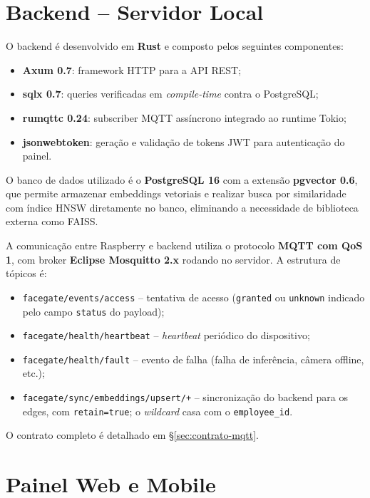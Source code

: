 \documentclass[12pt,a4paper]{report}
\begin{document}
\section{Backend -- Servidor Local}

O backend é desenvolvido em \textbf{Rust} e composto pelos seguintes componentes:

\begin{itemize}
    \item \textbf{Axum 0.7}: framework HTTP para a API REST;
    \item \textbf{sqlx 0.7}: queries verificadas em \textit{compile-time} contra o PostgreSQL;
    \item \textbf{rumqttc 0.24}: subscriber MQTT assíncrono integrado ao runtime Tokio;
    \item \textbf{jsonwebtoken}: geração e validação de tokens JWT para autenticação do painel.
\end{itemize}

O banco de dados utilizado é o \textbf{PostgreSQL 16} com a extensão \textbf{pgvector 0.6}, que permite armazenar embeddings vetoriais e realizar busca por similaridade com índice HNSW diretamente no banco, eliminando a necessidade de biblioteca externa como FAISS.

A comunicação entre Raspberry e backend utiliza o protocolo \textbf{MQTT com QoS\,1}, com broker \textbf{Eclipse Mosquitto 2.x} rodando no servidor. A estrutura de tópicos é:

\begin{itemize}
    \item \texttt{facegate/events/access} -- tentativa de acesso (\texttt{granted} ou \texttt{unknown} indicado pelo campo \texttt{status} do payload);
    \item \texttt{facegate/health/heartbeat} -- \textit{heartbeat} periódico do dispositivo;
    \item \texttt{facegate/health/fault} -- evento de falha (falha de inferência, câmera offline, etc.);
    \item \texttt{facegate/sync/embeddings/upsert/+} -- sincronização do backend para os edges, com \texttt{retain=true}; o \textit{wildcard} casa com o \texttt{employee\_id}.
\end{itemize}

O contrato completo é detalhado em §\ref{sec:contrato-mqtt}.

\section{Painel Web e Mobile}
\end{document}
